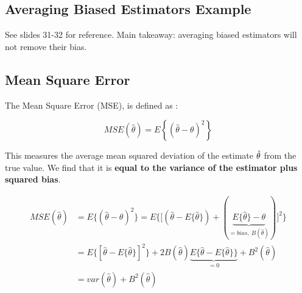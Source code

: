 \subsection{Averaging Biased Estimators Example}
See slides 31-32 for reference. Main takeaway: averaging biased  estimators will not remove their bias.


\subsection{Mean Square Error}

The Mean Square Error (MSE), is defined as :

\begin{equation}
    MSE(\hat{\theta})=E\left\{(\hat{\theta}-\theta)^2\right\}
\end{equation}

This measures the average mean squared deviation of the estimate $\hat{\theta}$ from the true value. We find that it is \textbf{equal to the variance of the estimator plus squared bias}.

\begin{equation}
    \begin{aligned}
MSE\left(\hat{\theta}\right)& =E\big\{(\hat{\theta}-\theta)^2\big\}=E\big\{\big[(\hat{\theta}-E\{\hat{\theta}\})+(\underbrace{E\{\hat{\theta}\}-\theta}_{=bias,~B(\hat{\theta})})\big]^2\big\}  \\
&=E\Big\{\left[\hat{\theta}-E\{\hat{\theta}\}\right]^2\Big\}+2B(\hat{\theta})\underbrace{E\big\{\hat{\theta}-E\{\hat{\theta}\}\big\}}_{=0}+B^2(\hat{\theta}) \\
&=var(\hat{\theta})+B^2(\hat{\theta})
\end{aligned}
\end{equation}

